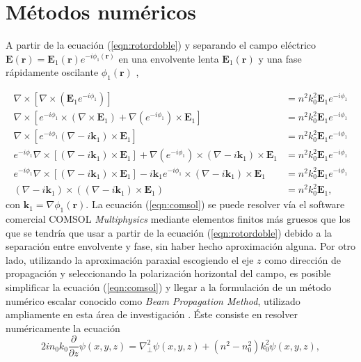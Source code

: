 \documentclass[12pt, letterpaper]{article}
\begin{document}
\section{Métodos numéricos}

A partir de la ecuación (\ref{eqn:rotordoble}) y separando el campo eléctrico $\textbf{E}(\textbf{r}) = \textbf{E}_1(\textbf{r}) e^{-i \phi_1 (\textbf{r})}$ en una envolvente lenta $\textbf{E}_1(\textbf{r})$ y una fase rápidamente oscilante $\phi_1 (\textbf{r})$ ,

\begin{align}
\nabla\times[\nabla\times(\textbf{E}_1 e^{-i \phi_1 })] &=  n^2k_0^2 \textbf{E}_1 e^{-i \phi_1}
\\
\nabla\times[ e^{-i \phi_1} \times (\nabla \times \textbf{E}_1) + \nabla(e^{-i \phi_1})\times \textbf{E}_1] &=  n^2k_0^2 \textbf{E}_1 e^{-i \phi_1}
\\
\nabla\times[ e^{-i \phi_1}  (\nabla  - i  \textbf{k} _1)\times\textbf{E}_1  ] &=  n^2k_0^2 \textbf{E}_1 e^{-i \phi_1}
\\
e^{-i \phi_1}  \nabla\times[ (\nabla  - i  \textbf{k} _1)\times\textbf{E}_1] + \nabla(e^{-i \phi_1})\times  (\nabla  - i  \textbf{k} _1)\times\textbf{E}_1  &=  n^2k_0^2 \textbf{E}_1 e^{-i \phi_1}
\\
e^{-i \phi_1}  \nabla\times[ (\nabla  - i  \textbf{k} _1)\times\textbf{E}_1] - i\textbf{k}_1 e^{-i \phi_1}\times  (\nabla  - i  \textbf{k} _1)\times\textbf{E}_1  &=  n^2k_0^2 \textbf{E}_1 e^{-i \phi_1}
\\
	(\nabla-i\textbf{k}_1)\times((\nabla-i\textbf{k}_1)\times \textbf{E}_1) &= n^2k_0^2 \textbf{E}_1,
	 \label{eqn:comsol}
\end{align}
con $\textbf{k}_1 = \nabla\phi_1(\textbf{r})$.
La ecuación (\ref{eqn:comsol}) se puede resolver vía el software comercial COMSOL \textit{Multiphysics} mediante elementos finitos más gruesos que los que se tendría que usar a partir de la ecuación (\ref{eqn:rotordoble}) debido a la separación entre envolvente y fase, sin haber hecho aproximación alguna. Por otro lado, utilizando la aproximación paraxial escogiendo el eje $z$  como dirección de propagación y seleccionando la polarización horizontal del campo, es posible simplificar la ecuación (\ref{eqn:comsol}) y llegar a la formulación de un método numérico escalar conocido como \textit{Beam Propagation Method}, utilizado ampliamente en esta área de investigación \cite{bics, interorbital, OAMCaging, vortex, bpm}. Éste consiste en resolver numéricamente la ecuación
\begin{equation}
	2in_0k_0\frac{\partial}{\partial z}\psi(x,y,z) = \nabla_\perp^2 \psi (x,y,z) + \left(n^2-n_0^2\right)k_0^2 \psi (x,y,z), \label{eqn:paraxial}
\end{equation}
\end{document}
